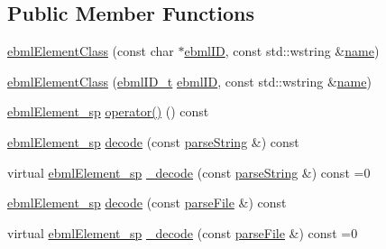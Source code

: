\subsection*{Public Member Functions}
\begin{DoxyCompactItemize}
\item 
\mbox{\hyperlink{classebml_1_1ebmlElementClass_a6c2081870c5d66c70e0cf988ff253420}{ebml\+Element\+Class}} (const char $\ast$\mbox{\hyperlink{classebml_1_1ebmlElementClass_a7d8337c9f9b884b43e1618b9392519b6}{ebml\+ID}}, const std\+::wstring \&\mbox{\hyperlink{classebml_1_1ebmlElementClass_aba4096c056179fb989da05d86f4cb46d}{name}})
\item 
\mbox{\hyperlink{classebml_1_1ebmlElementClass_a9ea21779aa5db15a70df73a03a873aa8}{ebml\+Element\+Class}} (\mbox{\hyperlink{namespaceebml_a86c5f604ddf12a74aa9812e997a58691}{ebml\+I\+D\+\_\+t}} \mbox{\hyperlink{classebml_1_1ebmlElementClass_a7d8337c9f9b884b43e1618b9392519b6}{ebml\+ID}}, const std\+::wstring \&\mbox{\hyperlink{classebml_1_1ebmlElementClass_aba4096c056179fb989da05d86f4cb46d}{name}})
\item 
\mbox{\hyperlink{namespaceebml_adad533b7705a16bb360fe56380c5e7be}{ebml\+Element\+\_\+sp}} \mbox{\hyperlink{classebml_1_1ebmlElementClass_a45bdca04f3008152ad7df0856ef8724b}{operator()}} () const
\item 
\mbox{\hyperlink{namespaceebml_adad533b7705a16bb360fe56380c5e7be}{ebml\+Element\+\_\+sp}} \mbox{\hyperlink{classebml_1_1ebmlElementClass_a9de19726c4794e4e3cb1f32e445c5002}{decode}} (const \mbox{\hyperlink{classebml_1_1parseString}{parse\+String}} \&) const
\item 
virtual \mbox{\hyperlink{namespaceebml_adad533b7705a16bb360fe56380c5e7be}{ebml\+Element\+\_\+sp}} \mbox{\hyperlink{classebml_1_1ebmlElementClass_aa6bf675de4918fd7b553d141871a2ede}{\+\_\+decode}} (const \mbox{\hyperlink{classebml_1_1parseString}{parse\+String}} \&) const =0
\item 
\mbox{\hyperlink{namespaceebml_adad533b7705a16bb360fe56380c5e7be}{ebml\+Element\+\_\+sp}} \mbox{\hyperlink{classebml_1_1ebmlElementClass_ab7f46d2ffffadf3b8be8f1d780b15a41}{decode}} (const \mbox{\hyperlink{classebml_1_1parseFile}{parse\+File}} \&) const
\item 
virtual \mbox{\hyperlink{namespaceebml_adad533b7705a16bb360fe56380c5e7be}{ebml\+Element\+\_\+sp}} \mbox{\hyperlink{classebml_1_1ebmlElementClass_aedbfff5909af215acaa3ca28643f1bc9}{\+\_\+decode}} (const \mbox{\hyperlink{classebml_1_1parseFile}{parse\+File}} \&) const =0
\item 

\end{DoxyCompactItemize}
